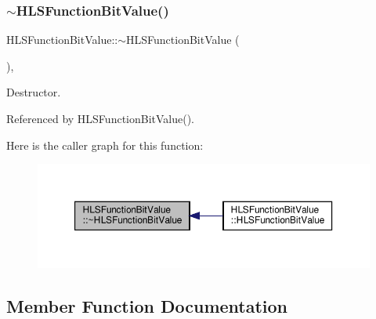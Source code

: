 \subsubsection{\texorpdfstring{$\sim$\+H\+L\+S\+Function\+Bit\+Value()}{~HLSFunctionBitValue()}}
{\footnotesize\ttfamily H\+L\+S\+Function\+Bit\+Value\+::$\sim$\+H\+L\+S\+Function\+Bit\+Value (\begin{DoxyParamCaption}{ }\end{DoxyParamCaption})\hspace{0.3cm}{\ttfamily [override]}, {\ttfamily [default]}}



Destructor. 



Referenced by H\+L\+S\+Function\+Bit\+Value().

Here is the caller graph for this function\+:
\nopagebreak
\begin{figure}[H]
\begin{center}
\leavevmode
\includegraphics[width=350pt]{d5/d41/classHLSFunctionBitValue_acdb33308c741c3d7593a26e4fb573952_icgraph}
\end{center}
\end{figure}


\subsection{Member Function Documentation}
\mbox{\label{classHLSFunctionBitValue_acf7f54956118f90a2d2e76f619656af4}} 
